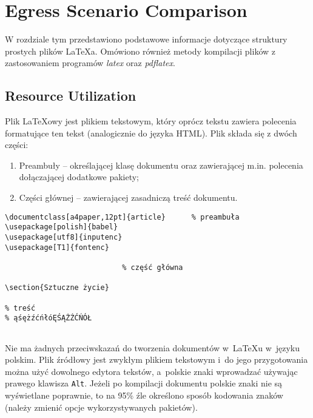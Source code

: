 \chapter{Egress Scenario Comparison}
\label{cha:compare_egress}

W rozdziale tym przedstawiono podstawowe informacje dotyczące struktury prostych plików \LaTeX a. Omówiono również metody kompilacji plików z zastosowaniem programów \emph{latex} oraz \emph{pdflatex}.


\section{Resource Utilization}
\label{sec:resources}

Plik \LaTeX owy jest plikiem tekstowym, który oprócz tekstu zawiera polecenia formatujące ten tekst (analogicznie do języka HTML). Plik składa się z dwóch części:
\begin{enumerate}%
\item Preambuły -- określającej klasę dokumentu oraz zawierającej m.in. polecenia dołączającej dodatkowe pakiety;

\item Części głównej -- zawierającej zasadniczą treść dokumentu.
\end{enumerate}


\begin{lstlisting}
\documentclass[a4paper,12pt]{article}      % preambuła
\usepackage[polish]{babel}
\usepackage[utf8]{inputenc}
\usepackage[T1]{fontenc}

                           % część główna

\section{Sztuczne życie}

% treść
% ąśężźćńłóĘŚĄŻŹĆŃÓŁ


\end{lstlisting}

Nie ma żadnych przeciwskazań do tworzenia dokumentów w~\LaTeX u w~języku polskim. Plik źródłowy jest zwykłym plikiem tekstowym i~do jego przygotowania można użyć dowolnego edytora tekstów, a~polskie znaki wprowadzać używając prawego klawisza \texttt{Alt}. Jeżeli po kompilacji dokumentu polskie znaki nie są wyświetlane poprawnie, to na 95\% źle określono sposób kodowania znaków (należy zmienić opcje wykorzystywanych pakietów).


